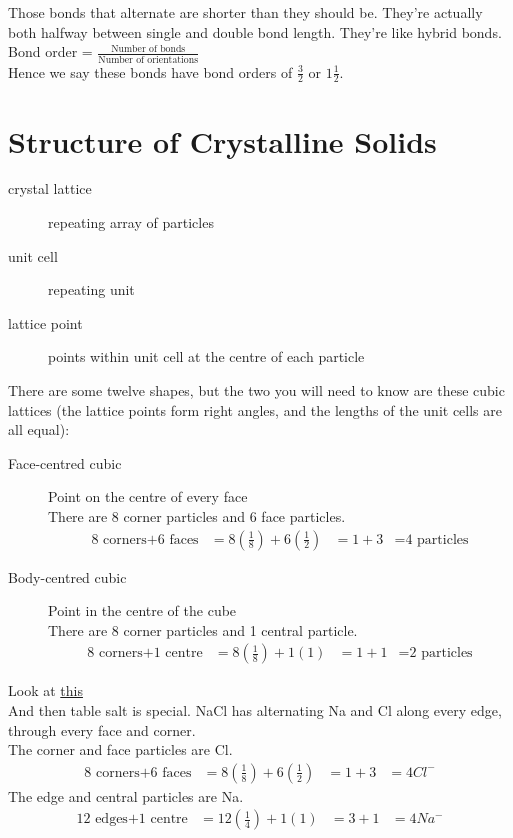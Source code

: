 \documentclass[a4paper, 8pt]{memoir}
\begin{document}
Those bonds that alternate are shorter than they should be. They're actually both halfway between single and double bond length. They're like hybrid bonds. \\

Bond order = $\frac{\text{Number of bonds}}{\text{Number of orientations}}$ \\

Hence we say these bonds have bond orders of $\frac{3}{2}$ or $1\frac{1}{2}$. \\

\chapter{Structure of Crystalline Solids}
\begin{description}
\item[crystal lattice] repeating array of particles
\item[unit cell] repeating unit
\item[lattice point] points within unit cell at the centre of each particle
\end{description}

There are some twelve shapes, but the two you will need to know are these cubic lattices (the lattice points form right angles, and the lengths of the unit cells are all equal):
\begin{description}
\item[Face-centred cubic] Point on the centre of every face \\
There are 8 corner particles and 6 face particles. \\
\begin{align*}
\text{8 corners} + \text{6 faces} &= 8(\frac{1}{8}) + 6(\frac{1}{2})
&= 1 + 3
&= \text{4 particles}
\end{align*}
\item[Body-centred cubic] Point in the centre of the cube \\
There are 8 corner particles and 1 central particle. \\
\begin{align*}
\text{8 corners} + \text{1 centre} &= 8(\frac{1}{8}) + 1(1)
&= 1 + 1
&= \text{2 particles}
\end{align*}
\end{description}

Look at \href{http://bit.ly/101SXqL}{this} \\

And then table salt is special. NaCl has alternating Na and Cl along every edge, through every face and corner. \\
The corner and face particles are Cl.
\begin{align*}
\text{8 corners} + \text{6 faces} &= 8(\frac{1}{8}) + 6(\frac{1}{2})
&= 1 + 3
&= 4 Cl^{-}
\end{align*}
The edge and central particles are Na.
\begin{align*}
\text{12 edges} + \text{1 centre} &= 12(\frac{1}{4}) + 1(1)
&= 3 + 1
&= 4 Na^{-}
\end{align*}
\end{document}
